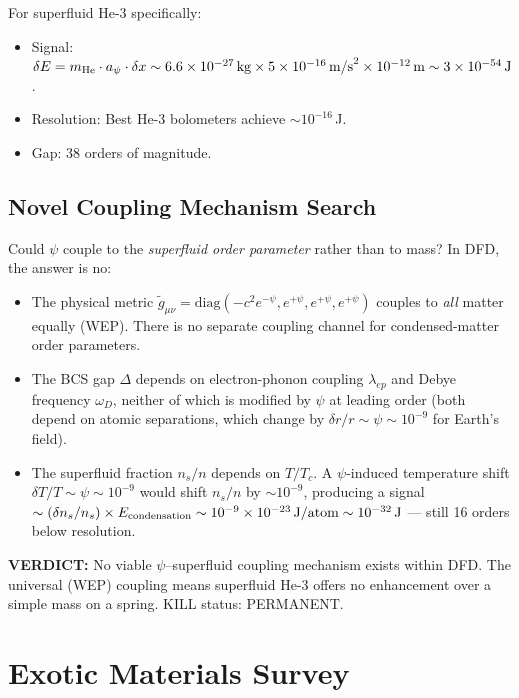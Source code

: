 \documentclass[11pt]{article}
\theoremstyle{remark}
\newcommand{\ee}[1]{\times 10^{#1}}
\newcommand{\verdict}[1]{\textcolor{green!50!black}{\textbf{VERDICT:} #1}}
\begin{document}
For superfluid He-3 specifically:
\begin{itemize}[nosep]
  \item Signal: $\delta E = m_{\rm He} \cdot a_\psi \cdot \delta x
    \sim 6.6\ee{-27}\,\text{kg} \times 5\ee{-16}\,\text{m/s}^2
    \times 10^{-12}\,\text{m} \sim 3\ee{-54}\,\text{J}$.
  \item Resolution: Best He-3 bolometers achieve $\sim 10^{-16}$\,J.
  \item Gap: 38 orders of magnitude.
\end{itemize}

\subsection{Novel Coupling Mechanism Search}

Could $\psi$ couple to the \emph{superfluid order parameter} rather
than to mass? In DFD, the answer is no:
\begin{itemize}[nosep]
  \item The physical metric $\tilde{g}_{\mu\nu} = \text{diag}(-c^2
    e^{-\psi}, e^{+\psi}, e^{+\psi}, e^{+\psi})$ couples to
    \emph{all} matter equally (WEP). There is no separate coupling
    channel for condensed-matter order parameters.
  \item The BCS gap $\Delta$ depends on electron-phonon coupling
    $\lambda_{ep}$ and Debye frequency $\omega_D$, neither of which
    is modified by $\psi$ at leading order (both depend on atomic
    separations, which change by $\delta r/r \sim \psi \sim 10^{-9}$
    for Earth's field).
  \item The superfluid fraction $n_s/n$ depends on $T/T_c$. A
    $\psi$-induced temperature shift $\delta T/T \sim \psi \sim 10^{-9}$
    would shift $n_s/n$ by $\sim 10^{-9}$, producing a signal
    $\sim (\delta n_s/n_s) \times E_{\rm condensation} \sim
    10^{-9} \times 10^{-23}\,\text{J/atom} \sim 10^{-32}\,\text{J}$ ---
    still 16 orders below resolution.
\end{itemize}

\verdict{No viable $\psi$--superfluid coupling mechanism exists within
DFD. The universal (WEP) coupling means superfluid He-3 offers no
enhancement over a simple mass on a spring. KILL status: PERMANENT.}


\section{Exotic Materials Survey}
\label{sec:exotic}
\end{document}
